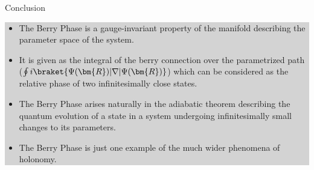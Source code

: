 \documentclass[9pt]{beamer}
\begin{document}
\begin{frame}{Conclusion}
  
  \centering
  \colorbox{lightgray}
  {
    \begin{minipage}{0.8\textwidth}
    \begin{itemize}
      \item The Berry Phase is a gauge-invariant property of the manifold describing
            the parameter space of the system.
      \pause
      \item It is given as the integral of the berry connection over the parametrized
        path ($\oint i \braket{\Psi(\bm{R})|\nabla|\Psi(\bm{R})}$) which can be
        considered as the relative phase of two infinitesimally close states.
      \pause
      \item The Berry Phase arises naturally in the adiabatic theorem describing the
            quantum evolution of a state in a system undergoing infinitesimally small changes
            to its parameters.
      \pause
      \item The Berry Phase is just one example of the much wider phenomena of holonomy.
    \end{itemize}
  \end{minipage}
  }

\end{frame}
\end{document}
